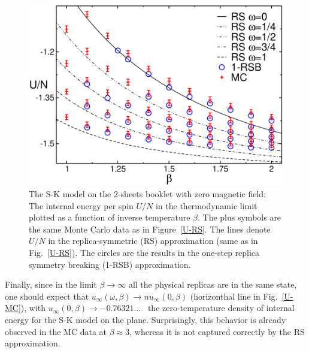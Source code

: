 \documentclass[twocolumn,superscriptaddress,prb,10pt]{revtex4-1}
\begin{document}
\begin{figure}[t]
\includegraphics*[width=0.93\linewidth]{./draft_figs/U_extrapolated_v1}
\caption{
 The S-K model on the 2-sheets booklet with zero magnetic field: 
 The internal energy per spin $U/N$ in the thermodynamic limit plotted 
 as a function of inverse temperature $\beta$. The plus symbols are the same 
 Monte Carlo data as in Figure~\ref{U-RS}. The lines denote $U/N$ 
 in the replica-symmetric (RS) approximation (same as in Fig.~\ref{U-RS}). 
 The circles are the results  in the one-step replica symmetry breaking 
 (1-RSB) approximation.
}
\label{U-RSB-1}
\end{figure}

Finally, since in the limit $\beta\to\infty$ all the physical replicas are in the same state, 
one should expect that $u_\infty(\omega,\beta)\to n u_\infty(0,\beta)$ (horizonthal line in 
Fig.~\ref{U-MC}), with $u_{\infty}(0,\beta)\to-0.76321...$~\cite{parisi-1979,parisi-1983} the 
zero-temperature density of internal energy for the S-K model on the plane. Surprisingly, 
this behavior is already observed in the MC data at $\beta\approx 3$, whereas it is not 
captured correctly by the RS approximation.
\end{document}
